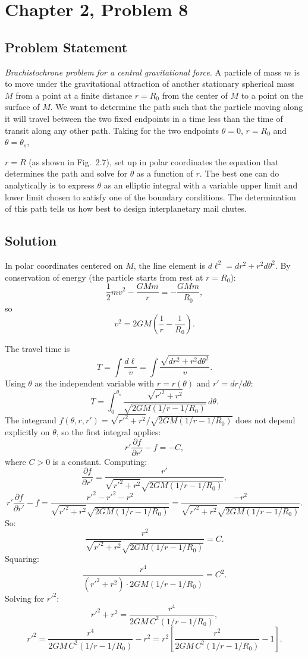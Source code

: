 \documentclass[12pt]{article}
\begin{document}
\section*{Chapter 2, Problem 8}

\subsection*{Problem Statement}
\textit{Brachistochrone problem for a central gravitational force.} A particle of mass $m$ is to move under the gravitational attraction of another stationary spherical mass $M$ from a point at a finite distance $r = R_0$ from the center of $M$ to a point on the surface of $M$. We want to determine the path such that the particle moving along it will travel between the two fixed endpoints in a time less than the time of transit along any other path. Taking for the two endpoints $\theta = 0$, $r = R_0$ and $\theta = \theta_s$,

$r = R$ (as shown in Fig.~2.7), set up in polar coordinates the equation that determines the path and solve for $\theta$ as a function of $r$. The best one can do analytically is to express $\theta$ as an elliptic integral with a variable upper limit and lower limit chosen to satisfy one of the boundary conditions. The determination of this path tells us how best to design interplanetary mail chutes.

\subsection*{Solution}

In polar coordinates centered on $M$, the line element is $d\ell^2 = dr^2 + r^2 d\theta^2$. By conservation of energy (the particle starts from rest at $r = R_0$):
\[
  \frac{1}{2}m v^2 - \frac{GMm}{r} = -\frac{GMm}{R_0},
\]
so
\[
  v^2 = 2GM\left(\frac{1}{r} - \frac{1}{R_0}\right).
\]

The travel time is
\[
  T = \int \frac{d\ell}{v} = \int \frac{\sqrt{dr^2 + r^2 d\theta^2}}{v}.
\]
Using $\theta$ as the independent variable with $r = r(\theta)$ and $r' = dr/d\theta$:
\[
  T = \int_0^{\theta_s} \frac{\sqrt{r'^2 + r^2}}{\sqrt{2GM(1/r - 1/R_0)}}\,d\theta.
\]
The integrand $f(\theta, r, r') = \sqrt{r'^2 + r^2}/\sqrt{2GM(1/r - 1/R_0)}$ does not depend explicitly on $\theta$, so the first integral applies:
\[
  r'\frac{\partial f}{\partial r'} - f = -C,
\]
where $C > 0$ is a constant. Computing:
\[
  \frac{\partial f}{\partial r'} = \frac{r'}{\sqrt{r'^2+r^2}\sqrt{2GM(1/r-1/R_0)}},
\]
\[
  r'\frac{\partial f}{\partial r'} - f = \frac{r'^2 - r'^2 - r^2}{\sqrt{r'^2+r^2}\sqrt{2GM(1/r-1/R_0)}} = \frac{-r^2}{\sqrt{r'^2+r^2}\sqrt{2GM(1/r-1/R_0)}}.
\]
So:
\[
  \frac{r^2}{\sqrt{r'^2+r^2}\sqrt{2GM(1/r-1/R_0)}} = C.
\]
Squaring:
\[
  \frac{r^4}{(r'^2+r^2)\cdot 2GM(1/r - 1/R_0)} = C^2.
\]
Solving for $r'^2$:
\[
  r'^2 + r^2 = \frac{r^4}{2GM\,C^2(1/r - 1/R_0)},
\]
\[
  r'^2 = \frac{r^4}{2GM\,C^2(1/r - 1/R_0)} - r^2
  = r^2\left[\frac{r^2}{2GM\,C^2(1/r - 1/R_0)} - 1\right].
\]
\end{document}
